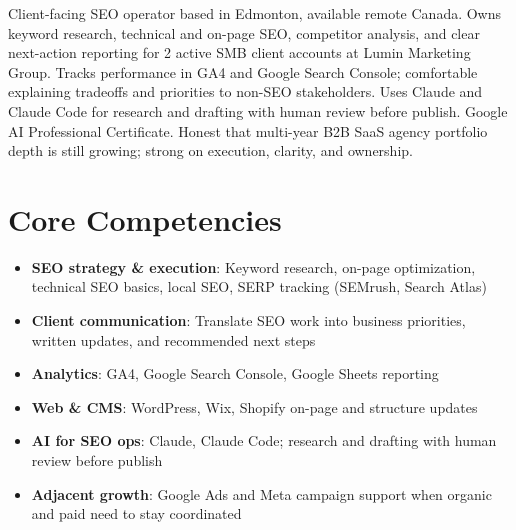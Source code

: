 \documentclass[11pt,a4paper,sans]{moderncv}
\begin{document}
\makecvtitle

\vspace{6pt}
\small{Client-facing SEO operator based in Edmonton, available remote Canada. Owns keyword research, technical and on-page SEO, competitor analysis, and clear next-action reporting for 2 active SMB client accounts at Lumin Marketing Group. Tracks performance in GA4 and Google Search Console; comfortable explaining tradeoffs and priorities to non-SEO stakeholders. Uses Claude and Claude Code for research and drafting with human review before publish. Google AI Professional Certificate. Honest that multi-year B2B SaaS agency portfolio depth is still growing; strong on execution, clarity, and ownership.}

\section{Core Competencies}
\vspace{1pt}
\begin{itemize}
\item \textbf{SEO strategy \& execution}: Keyword research, on-page optimization, technical SEO basics, local SEO, SERP tracking (SEMrush, Search Atlas)
\item \textbf{Client communication}: Translate SEO work into business priorities, written updates, and recommended next steps
\item \textbf{Analytics}: GA4, Google Search Console, Google Sheets reporting
\item \textbf{Web \& CMS}: WordPress, Wix, Shopify on-page and structure updates
\item \textbf{AI for SEO ops}: Claude, Claude Code; research and drafting with human review before publish
\item \textbf{Adjacent growth}: Google Ads and Meta campaign support when organic and paid need to stay coordinated
\end{itemize}
\end{document}
